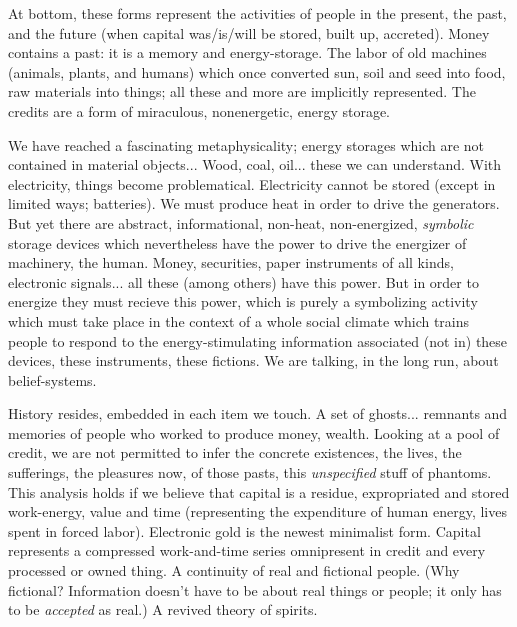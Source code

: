 \documentclass[11pt,twoside,draft]{memoir}
\begin{document}
At bottom, these forms represent the activities of people in the present, the past, and
the future (when capital was/is/will be
stored, built up, accreted). Money contains a
past: it is a memory and energy-storage. The
labor of old machines (animals, plants, and
humans) which once converted sun, soil and
seed into food, raw materials into things; all
these and more are implicitly represented.
The credits are a form of miraculous, nonenergetic, energy storage.

We have reached a fascinating metaphysicality; energy storages which are not contained in material objects... Wood, coal, oil... these we can understand. With electricity, things become problematical. Electricity
cannot be stored (except in limited ways;
batteries). We must produce heat in order to
drive the generators. But yet there are abstract,
informational, non-heat, non-energized, \emph{symbolic} storage devices which nevertheless
have the power to drive the energizer of machinery,
the human. Money, securities, paper instruments of all kinds,
electronic signals... all these (among others) have this power.
But in order to energize they must recieve this power, which is purely a symbolizing activity which must take place in the context of a whole social climate which trains people to respond to the energy-stimulating information associated (not in) these devices, these instruments, these fictions. We are talking, in the long run, about belief-systems.

History resides, embedded in each item we touch. A set of ghosts... remnants and memories of people who worked to produce money, wealth. Looking at a pool of credit, we are not permitted to infer the concrete existences, the lives, the sufferings, the pleasures now, of those pasts, this \emph{unspecified} stuff of phantoms. This analysis holds if we believe that capital is a residue, expropriated and stored work-energy, value and time (representing the expenditure of human energy, lives spent in forced labor). Electronic gold is the newest minimalist form. Capital represents a compressed work-and-time series omnipresent in credit and every processed or owned thing. A continuity of real and fictional people. (Why fictional? Information doesn't have to be about real things or people; it only has to be \emph{accepted} as real.) A revived theory of spirits.
\end{document}
